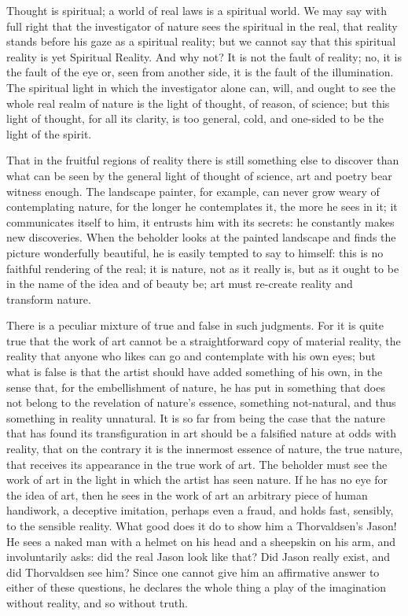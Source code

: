 \documentclass[12pt,a4paper,openany]{book}
\newcommand{\opage}[1]{\marginnote{\footnotesize\textit{[#1]}}}
\begin{document}
Thought is spiritual; a world of real laws is
a spiritual world. We may say with full right that
the investigator of nature sees the spiritual in the real, that
reality stands before his gaze as a spiritual reality;
but we cannot say that this spiritual
reality is yet Spiritual Reality. And why
not? It is not the fault of reality; no, it is the fault
of the eye or, seen from another side, it is the fault of the illumination.
The spiritual light in which the investigator
alone can, will, and ought to see the whole real realm of nature
is the light of thought, of reason, of science; but this
light of thought, for all its clarity, is too general, cold, and
one-sided to be the light of the spirit.

That in the fruitful regions of reality there is still
something else to discover than what can be seen by the general
light of thought of science, art and
poetry bear witness enough. The landscape painter, for
example, can never grow weary of contemplating nature, for
the longer he contemplates it, the more he sees in
it; it communicates itself to him, it entrusts him with its
secrets: he constantly makes new discoveries.
When the beholder looks at the painted landscape and finds
the picture wonderfully beautiful, he is easily tempted to
say to himself: this is no faithful rendering of
the real; it is nature, not as it really
is, but as it ought to be in the name of the idea and of beauty
\setcounter{footnote}{0}%
\opage{291}be; art must re-create reality and transform
nature.

There is a peculiar mixture of true
and false in such judgments. For it is quite true that the work of art
cannot be a straightforward copy of material reality,
the reality that anyone who likes can
go and contemplate with his own eyes; but what is false
is that the artist should have added something of his
own, in the sense that, for the embellishment of nature,
he has put in something that does not belong to the revelation
of nature's essence, something not-natural, and thus
something in reality unnatural. It is so far from being the case
that the nature that has found its transfiguration in art
should be a falsified nature at odds with reality,
that on the contrary it is the innermost essence of nature, the
true nature, that receives its appearance in the true
work of art. The beholder must see the work of art in the light
in which the artist has seen nature. If he has no eye
for the idea of art, then he sees in the work of art an arbitrary
piece of human handiwork, a deceptive imitation, perhaps
even a fraud, and holds fast, sensibly, to the
sensible reality. What good does it do to show
him a Thorvaldsen's Jason! He sees a naked man
with a helmet on his head and a sheepskin on his arm,
and involuntarily asks: did the real Jason
look like that? Did Jason really exist, and did
Thorvaldsen see him? Since one cannot give him an
affirmative answer to either of these questions, he
declares the whole thing a play of the imagination without reality,
and so without truth.
\end{document}
